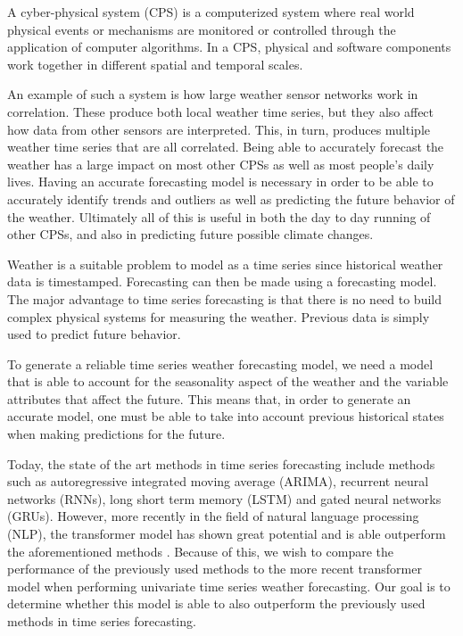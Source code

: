 \label{sec:intro}
A cyber-physical system (CPS) is a computerized system where real world physical events or mechanisms are monitored or controlled through the application of computer algorithms.
In a CPS, physical and software components work together in different spatial and temporal scales.

An example of such a system is how large weather sensor networks work in correlation. These produce both local weather time series, but they also affect how data from other sensors are interpreted. This, in turn, produces multiple weather time series that are all correlated. Being able to accurately forecast the weather has a large impact on most other CPSs as well as most people's daily lives. Having an accurate forecasting model is necessary in order to be able to accurately identify trends and outliers as well as predicting the future behavior of the weather. Ultimately all of this is useful in both the day to day running of other CPSs, and also in predicting future possible climate changes. 

Weather is a suitable problem to model as a time series since historical weather data is timestamped.
Forecasting can then be made using a forecasting model.
The major advantage to time series forecasting is that there is no need to build complex physical systems for measuring the weather. 
Previous data is simply used to predict future behavior.

To generate a reliable time series weather forecasting model, we need a model that is able to account for the seasonality aspect of the weather and the variable attributes that affect the future. 
This means that, in order to generate an accurate model, one must be able to take into account previous historical states when making predictions for the future. 

Today, the state of the art methods in time series forecasting include methods such as autoregressive integrated moving average (ARIMA), recurrent neural networks (RNNs), long short term memory (LSTM) and gated neural networks
(GRUs).
However, more recently in the field of natural language processing (NLP), the transformer model has shown great potential and is able outperform the aforementioned methods \cite{AttentionIsAllYouNeed}.
Because of this, we wish to compare the performance of the previously used methods to the more recent transformer model when performing univariate time series weather forecasting. Our goal is to determine whether this model is able to also outperform the previously used methods in time series forecasting.
